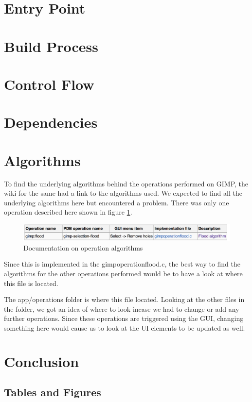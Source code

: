 \section{Entry Point}
\section{Build Process}
\section{Control Flow}
\section{Dependencies}
\section{Algorithms}
To find the underlying algorithms behind the operations performed on GIMP, the wiki for the same had a link to the algorithms used. We expected to find all the underlying algorithms here but encountered a problem. There was only one operation described here shown in figure \ref{fig:algorithm}.

\begin{figure}
\centering
\includegraphics[width=1\textwidth]{algorithm.png}
\caption{\label{fig:algorithm}Documentation on operation algorithms}
\end{figure}

Since this is implemented in the gimpoperationflood.c, the best way to find the algorithms for the other operations performed would be to have a look at where this file is located.
 
The app/operations folder is where this file located. Looking at the other files in the folder, we got an idea of where to look incase we had to change or add any further operations. Since these operations are triggered using the GUI, changing something here would cause us to look at the UI elements to be updated as well.

\section{Conclusion}

\subsection{Tables and Figures}

